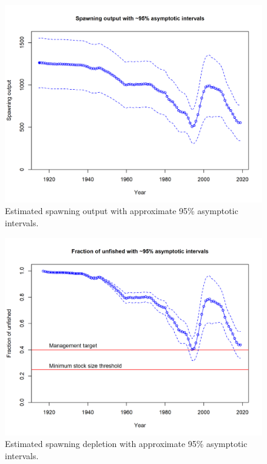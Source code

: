 \documentclass[12pt,]{article}
\begin{document}
\begin{figure}
\centering
\includegraphics{r4ss/plots_mod1/ts7_Spawning_output_with_95_asymptotic_intervals_intervals.png}
\caption{Estimated spawning output with approximate 95\% asymptotic
intervals.
\label{fig:ts7_Spawning_biomass_(mt)_with_95_asymptotic_intervals_intervals}}
\end{figure}

\begin{figure}
\centering
\includegraphics{r4ss/plots_mod1/ts9_Fraction_of_unfished_with_95_asymptotic_intervals_intervals.png}
\caption{Estimated spawning depletion with approximate 95\% asymptotic
intervals.
\label{fig:ts9_unfished_with_95_asymptotic_intervals_intervals}}
\end{figure}
\end{document}
